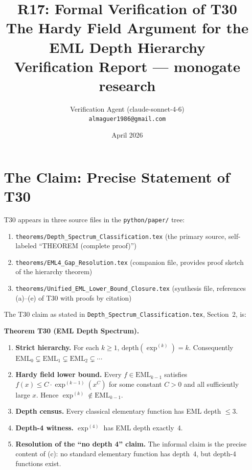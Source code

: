 \documentclass[12pt,a4paper]{article}
\title{R17: Formal Verification of T30\\
       \large The Hardy Field Argument for the EML Depth Hierarchy\\
       \normalsize Verification Report --- monogate research}
\author{Verification Agent (claude-sonnet-4-6)\\
\small \texttt{almaguer1986@gmail.com}}
\date{April 2026}
\theoremstyle{definition}
\theoremstyle{remark}
\begin{document}
\maketitle
\tableofcontents

\section{The Claim: Precise Statement of T30}

T30 appears in three source files in the \texttt{python/paper/} tree:
\begin{enumerate}
  \item \texttt{theorems/Depth\_Spectrum\_Classification.tex} (the primary source,
        self-labeled ``THEOREM (complete proof)'')
  \item \texttt{theorems/EML4\_Gap\_Resolution.tex} (companion file, provides
        proof sketch of the hierarchy theorem)
  \item \texttt{theorems/Unified\_EML\_Lower\_Bound\_Closure.tex} (synthesis
        file, references (a)--(e) of T30 with proofs by citation)
\end{enumerate}

The T30 claim as stated in \texttt{Depth\_Spectrum\_Classification.tex},
Section~2, is:

\medskip
\noindent\textbf{Theorem T30 (EML Depth Spectrum).}
\begin{enumerate}
  \item[\textbf{(a)}] \textbf{Strict hierarchy.} For each $k\geq 1$,
        $\mathrm{depth}(\exp^{(k)})=k$.  Consequently
        $\mathrm{EML}_0\subsetneq\mathrm{EML}_1\subsetneq\mathrm{EML}_2
        \subsetneq\cdots$

  \item[\textbf{(b)}] \textbf{Hardy field lower bound.} Every
        $f\in\mathrm{EML}_{k-1}$ satisfies
        $f(x)\leq C\cdot\exp^{(k-1)}(x^C)$
        for some constant $C>0$ and all sufficiently large $x$.
        Hence $\exp^{(k)}\notin\mathrm{EML}_{k-1}$.

  \item[\textbf{(c)}] \textbf{Depth census.} Every classical elementary
        function has EML depth $\leq 3$.

  \item[\textbf{(d)}] \textbf{Depth-4 witness.} $\exp^{(4)}$ has EML
        depth exactly~4.

  \item[\textbf{(e)}] \textbf{Resolution of the ``no depth 4'' claim.}
        The informal claim is the precise content of (c): no standard
        elementary function has depth~4, but depth-4 functions exist.
\end{enumerate}
\end{document}
